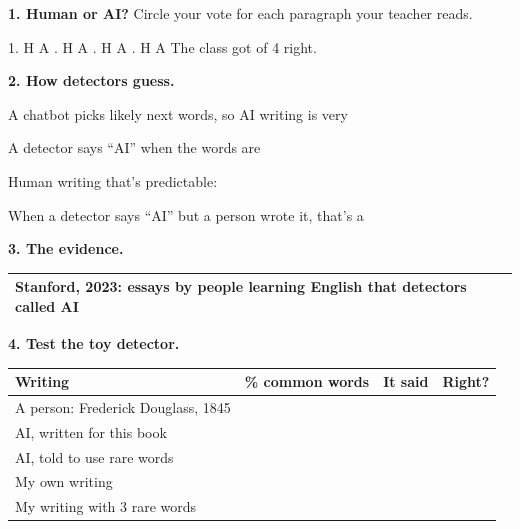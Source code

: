 \documentclass[11pt]{article}
\begin{document}
\partner


\vspace{0.4em}
{\large\textbf{1. Human or AI?}} Circle your vote for each paragraph your teacher reads.

\vspace{0.5em}
1. H \; A . H \; A . H \; A . H \; A \qquad The class got \ansline{0.5in}{} of 4 right.

\vspace{1.0em}
{\large\textbf{2. How detectors guess.}}

\vspace{0.5em}
A chatbot picks likely next words, so AI writing is very 

\vspace{0.7em}
A detector says ``AI'' when the words are 

\vspace{0.7em}
Human writing that's predictable: 

\vspace{0.5em}

\vspace{0.7em}
When a detector says ``AI'' but a person wrote it, that's a 

\vspace{1.0em}
{\large\textbf{3. The evidence.}}

\vspace{0.3em}
\begin{tabular}{|R{3.6in}|R{2.9in}|}
\hline
Stanford, 2023: essays by people learning English that detectors called AI &  \\[0.3em] \hline
\end{tabular}

\newpage


{\large\textbf{4. Test the toy detector.}}

\vspace{0.3em}
\begin{tabular}{|R{2.6in}|c|c|c|}
\hline
\textbf{Writing} & \textbf{\% common words} & \textbf{It said} & \textbf{Right?} \\ \hline
A person: Frederick Douglass, 1845 &  &  &  \\ \hline
AI, written for this book &  &  &  \\ \hline
AI, told to use rare words &  &  &  \\ \hline
My own writing & & & \\ \hline
My writing with 3 rare words & & & \\ \hline
\end{tabular}
\end{document}
